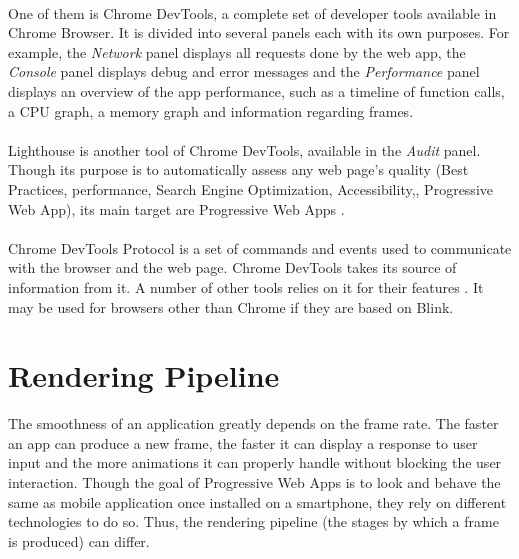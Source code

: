 \documentclass{kththesis}
\begin{document}
\paragraph{}
One of them is Chrome DevTools, a complete set of developer tools available in Chrome Browser. It is divided into several panels each with its own purposes. For example, the \textit{Network} panel displays all requests done by the web app, the \textit{Console} panel displays debug and error messages and the \textit{Performance} panel \cite{chrome_devtools_perf} displays an overview of the app performance, such as a timeline of function calls, a CPU graph, a memory graph and information regarding frames. 

\paragraph{}
Lighthouse \cite{lighthouse} is another tool of Chrome DevTools, available in the \textit{Audit} panel. Though its purpose is to automatically assess any web page's quality (Best Practices, performance, Search Engine Optimization, Accessibility,, Progressive Web App), its main target are Progressive Web Apps \cite{PWApossibleUnifer}. 

\paragraph{}
Chrome DevTools Protocol \cite{CDP} is a set of commands and events used to communicate with the browser and the web page. Chrome DevTools takes its source of information from it. A number of other tools relies on it for their features \cite{awesome_CDP}. It may be used for browsers other than Chrome if they are based on Blink.



\section{Rendering Pipeline}

The smoothness of an application greatly depends on the frame rate. The faster an app can produce a new frame, the faster it can display a response to user input and the more animations it can properly handle without blocking the user interaction. \newline
Though the goal of Progressive Web Apps is to look and behave the same as mobile application once installed on a smartphone, they rely on different technologies to do so. Thus, the rendering pipeline (the stages by which a frame is produced) can differ.
\end{document}

